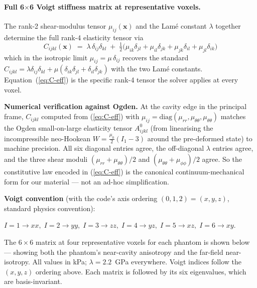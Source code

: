 \documentclass[11pt,letterpaper]{article}
\newcommand{\vect}[1]{\boldsymbol{#1}}
\begin{document}
\paragraph{Full 6$\times$6 Voigt stiffness matrix at representative voxels.}
\label{par:voigt-tables}
The rank-2 shear-modulus tensor $\mu_{ij}(\vect x)$ and the Lamé
constant $\lambda$ together determine the full rank-4 elasticity
tensor via
\begin{equation}
\boxed{\;
C_{ijkl}(\vect x) \;=\; \lambda\,\delta_{ij}\delta_{kl}
\;+\; \tfrac{1}{2}\bigl(\mu_{ik}\delta_{jl} + \mu_{il}\delta_{jk}
                       + \mu_{jk}\delta_{il} + \mu_{jl}\delta_{ik}\bigr)
\;}
\label{eq:C-eff}
\end{equation}
which in the isotropic limit $\mu_{ij} = \mu\,\delta_{ij}$ recovers
the standard $C_{ijkl} = \lambda\delta_{ij}\delta_{kl} +
\mu(\delta_{ik}\delta_{jl} + \delta_{il}\delta_{jk})$ with the two
Lamé constants. Equation~(\ref{eq:C-eff}) is the specific rank-4
tensor the solver applies at every voxel.

\textbf{Numerical verification against Ogden.} At the cavity edge in
the principal frame, $C_{ijkl}$ computed from (\ref{eq:C-eff}) with
$\mu_{ij} = \mathrm{diag}(\mu_{rr},\mu_{\theta\theta},\mu_{\theta\theta})$
matches the Ogden small-on-large elasticity tensor
$A^{0}_{ijkl}$ (from linearising the incompressible neo-Hookean
$W = \tfrac{\mu_0}{2}(I_1{-}3)$ around the pre-deformed state) to
machine precision. All six diagonal entries agree, the off-diagonal
$\lambda$ entries agree, and the three shear moduli
$(\mu_{rr}+\mu_{\theta\theta})/2$ and $(\mu_{\theta\theta}+\mu_{\phi\phi})/2$
agree. So the constitutive law encoded in (\ref{eq:C-eff}) is the
canonical continuum-mechanical form for our material — not an
ad-hoc simplification.

\textbf{Voigt convention} (with the code's axis ordering
$(0, 1, 2) = (x, y, z)$, standard physics convention):
\begin{center}
$I{=}1{\to}xx,\; I{=}2{\to}yy,\; I{=}3{\to}zz,\; I{=}4{\to}yz,\; I{=}5{\to}xz,\; I{=}6{\to}xy$.
\end{center}

The $6{\times}6$ matrix at four representative voxels for each
phantom is shown below — showing both the phantom's near-cavity
anisotropy and the far-field near-isotropy. All values in
\si{\kilo\pascal}; $\lambda = 2.2$~GPa everywhere. Voigt indices
follow the $(x,y,z)$ ordering above. Each matrix is followed by its
six eigenvalues, which are basis-invariant.
\end{document}

